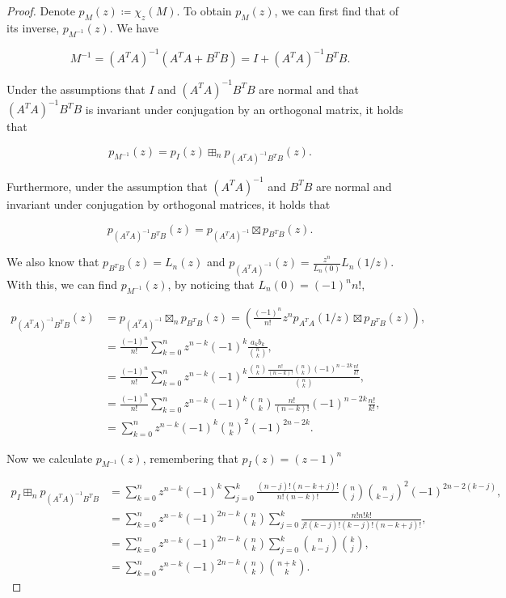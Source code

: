 \begin{proof}

Denote $p_M(z) \coloneqq \chi_z(M)$. To obtain \( p_M(z) \), we can first find that of its inverse, \( p_{M^{-1}}(z) \). We have

\begin{equation*}
    M^{-1} = (A^TA)^{-1}(A^TA + B^TB) = I + (A^TA)^{-1}B^TB.
\end{equation*}

Under the assumptions that \( I \) and \( (A^TA)^{-1}B^TB \) are normal and that \( (A^TA)^{-1}B^TB \) is invariant under conjugation by an orthogonal matrix, it holds that

\begin{equation*}
    p_{M^{-1}}(z) = p_I(z) \boxplus_n p_{(A^TA)^{-1}B^TB}(z).
\end{equation*}

Furthermore, under the assumption that \( (A^TA)^{-1} \) and \( B^TB \) are normal and invariant under conjugation by orthogonal matrices, it holds that

\begin{equation*}
    p_{(A^TA)^{-1}B^TB}(z) = p_{(A^TA)^{-1}} \boxtimes p_{B^TB}(z).
\end{equation*}

We also know that \( p_{B^TB}(z) = L_n(z) \) and \( p_{(A^TA)^{-1}}(z)=\frac{z^n}{L_n(0)} L_n(1/z) \). With this, we can find \( p_{M^{-1}}(z) \), by noticing that $L_n(0)= (-1)^nn!$,


\begin{align*}
    p_{(A^TA)^{-1}B^TB}(z) &= p_{(A^TA)^{-1}} \boxtimes_n p_{B^TB}(z) = (\frac{(-1)^n}{n!}z^n p_{A^T A}(1/z) \boxtimes p_{B^TB}(z)),\\
    &= \frac{(-1)^n}{n!}\sum_{k=0}^n z^{n-k} (-1)^k \frac{a_kb_k}{\binom{n}{k}},\\ 
    &= \frac{(-1)^n}{n!}\sum_{k=0}^n z^{n-k}(-1)^k \frac{\binom{n}{k}\frac{n!}{(n-k)!}\binom{n}{k}(-1)^{n-2k}\frac{n!}{k!}}{\binom{n}{k}}, \\
    &= \frac{(-1)^n}{n!}\sum_{k=0}^n z^{n-k}(-1)^k \binom{n}{k}\frac{n!}{(n-k)!}(-1)^{n-2k}\frac{n!}{k!},\\
    &= \sum_{k=0}^n z^{n-k}(-1)^k \binom{n}{k}^2 (-1)^{2n-2k}.
\end{align*}

Now we calculate \( p_{M^{-1}}(z) \), remembering that \( p_I(z) = (z-1)^n \)

\begin{align*}
    p_I \boxplus_n p_{(A^TA)^{-1}B^TB} &= \sum_{k=0}^n z^{n-k}(-1)^k \sum_{j=0}^k \frac{(n-j)!(n-k+j)!}{n!(n-k)!}\binom{n}{j}\binom{n}{k-j}^2(-1)^{2n-2(k-j)},\\ 
    &= \sum_{k=0}^n z^{n-k}(-1)^{2n-k}\binom{n}{k} \sum_{j=0}^k \frac{n!n!k!}{j!(k-j)!(k-j)!(n-k+j)!},\\ 
    &= \sum_{k=0}^n z^{n-k}(-1)^{2n-k}\binom{n}{k} \sum_{j=0}^k \binom{n}{k-j}\binom{k}{j},\\  
    &= \sum_{k=0}^n z^{n-k}(-1)^{2n-k}\binom{n}{k} \binom{n+k}{k}.
\end{align*}


\end{proof}
